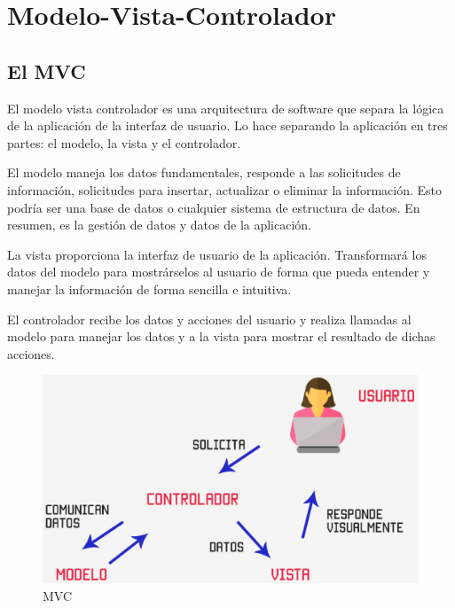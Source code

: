 \section{Modelo-Vista-Controlador}
\label{:sec3}

\subsection{El MVC}
\label{3:3:1}

El modelo vista controlador es una arquitectura de software que separa la lógica de la aplicación de la interfaz de usuario. Lo hace separando la aplicación en tres partes: el modelo, la vista y el controlador.

El modelo maneja los datos fundamentales, responde a las solicitudes de información, solicitudes para insertar, actualizar o eliminar la información. Esto podría ser una base de datos o cualquier sistema de estructura de datos. En resumen, es la gestión de datos y datos de la aplicación.

La vista proporciona la interfaz de usuario de la aplicación. Transformará los datos del modelo para mostrárselos al usuario de forma que pueda entender y manejar la información de forma sencilla e intuitiva.

El controlador recibe los datos y acciones del usuario y realiza llamadas al modelo para manejar los datos y a la vista para mostrar el resultado de dichas acciones.

\begin{figure}[!th]
\begin{center}
\includegraphics[scale=0.3]{images/29}
\caption{MVC}
\label{fig:MVC}
\end{center}
\end{figure}

